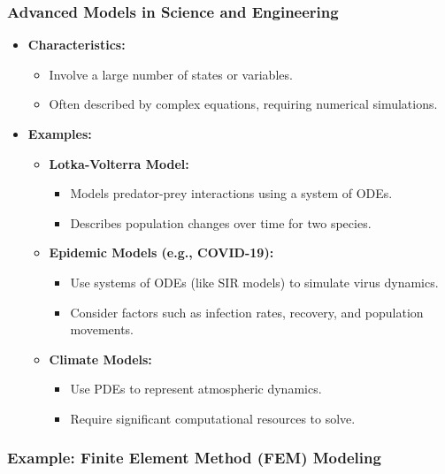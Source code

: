 \documentclass{beamer}
\begin{document}
\begin{frame}
\frametitle{Advanced Models in Science and Engineering}
\begin{itemize}
    \item \textbf{Characteristics:} 
    \begin{itemize}
        \item Involve a large number of states or variables.
        \item Often described by complex equations, requiring numerical simulations.
    \end{itemize}
    \item \textbf{Examples:}
    \begin{itemize}
        \item \textbf{Lotka-Volterra Model:} 
        \begin{itemize}
            \item Models predator-prey interactions using a system of ODEs.
            \item Describes population changes over time for two species.
        \end{itemize}
        \item \textbf{Epidemic Models (e.g., COVID-19):} 
        \begin{itemize}
            \item Use systems of ODEs (like SIR models) to simulate virus dynamics.
            \item Consider factors such as infection rates, recovery, and population movements.
        \end{itemize}
        \item \textbf{Climate Models:} 
        \begin{itemize}
            \item Use PDEs to represent atmospheric dynamics.
            \item Require significant computational resources to solve.
        \end{itemize}
    \end{itemize}
\end{itemize}
\end{frame}

\subsubsection{Example: Finite Element Method (FEM) Modeling}
\end{document}
